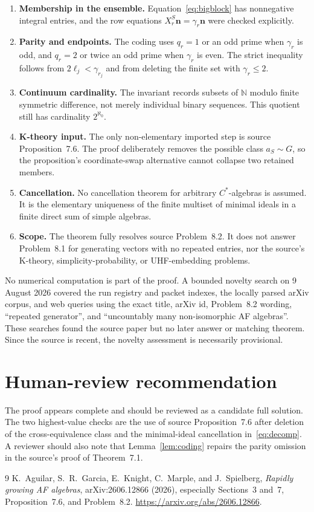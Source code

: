 \documentclass[11pt]{article}
\newcommand{\N}{\mathbb N}
\begin{document}
\begin{enumerate}[leftmargin=*,itemsep=4pt]
\item \textbf{Membership in the ensemble.} Equation~\eqref{eq:bigblock} has nonnegative integral entries, and the row equations $X_r^S\mathbf n=\gamma_r\mathbf n$ were checked explicitly.
\item \textbf{Parity and endpoints.} The coding uses $q_r=1$ or an odd prime when $\gamma_r$ is odd, and $q_r=2$ or twice an odd prime when $\gamma_r$ is even. The strict inequality follows from $2\ell_j<\gamma_{r_j}$ and from deleting the finite set with $\gamma_r\le2$.
\item \textbf{Continuum cardinality.} The invariant records subsets of $\N$ modulo finite symmetric difference, not merely individual binary sequences. This quotient still has cardinality $2^{\aleph_0}$.
\item \textbf{K-theory input.} The only non-elementary imported step is source Proposition~7.6. The proof deliberately removes the possible class $a_S\sim G$, so the proposition's coordinate-swap alternative cannot collapse two retained members.
\item \textbf{Cancellation.} No cancellation theorem for arbitrary $C^*$-algebras is assumed. It is the elementary uniqueness of the finite multiset of minimal ideals in a finite direct sum of simple algebras.
\item \textbf{Scope.} The theorem fully resolves source Problem~8.2. It does not answer Problem~8.1 for generating vectors with no repeated entries, nor the source's K-theory, simplicity-probability, or UHF-embedding problems.
\end{enumerate}

No numerical computation is part of the proof. A bounded novelty search on 9 August 2026 covered the run registry and packet indexes, the locally parsed arXiv corpus, and web queries using the exact title, arXiv id, Problem~8.2 wording, ``repeated generator'', and ``uncountably many non-isomorphic AF algebras''. These searches found the source paper but no later answer or matching theorem. Since the source is recent, the novelty assessment is necessarily provisional.

\section{Human-review recommendation}

The proof appears complete and should be reviewed as a candidate full solution. The two highest-value checks are the use of source Proposition~7.6 after deletion of the cross-equivalence class and the minimal-ideal cancellation in~\eqref{eq:decomp}. A reviewer should also note that Lemma~\ref{lem:coding} repairs the parity omission in the source's proof of Theorem~7.1.

\begin{thebibliography}{9}
K.~Aguilar, S.~R.~Garcia, E.~Knight, C.~Marple, and J.~Spielberg,
\emph{Rapidly growing AF algebras}, arXiv:2606.12866 (2026), especially Sections~3 and~7, Proposition~7.6, and Problem~8.2.
\url{https://arxiv.org/abs/2606.12866}.
\end{thebibliography}
\end{document}
